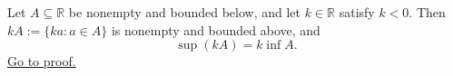 \begin{theorem}
\label{thm:scalar-mult-negative}
Let $A\subseteq\mathbb{R}$ be nonempty and bounded below, and let
$k\in\mathbb{R}$ satisfy $k<0$.  Then $kA:=\{ka:a\in A\}$ is nonempty and
bounded above, and
\[
  \sup(kA)=k\inf A.
\]
\hyperref[prf:scalar-mult-negative]{Go to proof.}
\end{theorem}